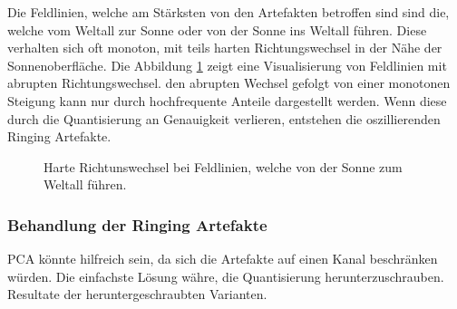 Die Feldlinien, welche am Stärksten von den Artefakten betroffen sind sind die, welche vom Weltall zur Sonne oder von der Sonne ins Weltall führen. Diese verhalten sich oft monoton, mit teils harten Richtungswechsel in der Nähe der Sonnenoberfläche. Die Abbildung \ref{resultate:loesung1:dct:randbehandlung:harte_richtungswechsel} zeigt eine Visualisierung von Feldlinien mit abrupten Richtungswechsel. den abrupten Wechsel gefolgt von einer monotonen Steigung kann nur durch hochfrequente Anteile dargestellt werden. Wenn diese durch die Quantisierung an Genauigkeit verlieren, entstehen die oszillierenden Ringing Artefakte. 
\begin{figure}
	\caption{Harte Richtunswechsel bei Feldlinien, welche von der Sonne zum Weltall führen.}
	\label{resultate:loesung1:dct:randbehandlung:harte_richtungswechsel}
\end{figure}

\subsubsection{Behandlung der Ringing Artefakte}
PCA könnte hilfreich sein, da sich die Artefakte auf einen Kanal beschränken würden. Die einfachste Lösung währe, die Quantisierung herunterzuschrauben.
Resultate der heruntergeschraubten Varianten.